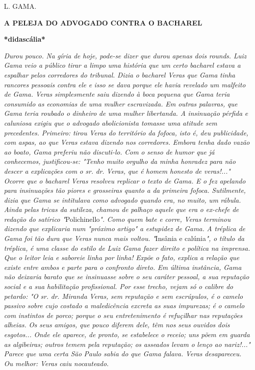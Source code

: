 L. GAMA.

\textbf{A PELEJA DO
ADVOGADO CONTRA O BACHAREL}

\textbf{*didascália*}

\emph{Durou pouco. Na gíria de hoje, pode-se dizer que durou apenas dois
rounds. Luiz Gama veio a público tirar a limpo uma história que um certo
bacharel estava a espalhar pelos corredores do tribunal. Dizia o
bacharel Veras que Gama tinha rancores pessoais contra ele e isso se
dava porque ele havia revelado um malfeito de Gama. Veras simplesmente
saiu dizendo à boca pequena que Gama teria consumido as economias de uma
mulher escravizada. Em outras palavras, que Gama teria roubado o
dinheiro de uma mulher libertanda. A insinuação pérfida e caluniosa
exigiu que o advogado abolicionista tomasse uma atitude sem precedentes.
Primeiro: tirou Veras do território da fofoca, isto é, deu publicidade,
com aspas, ao que Veras estava dizendo nos corredores. Embora tenha dado
vazão ao boato, Gama preferiu não discuti-lo. Com o senso de humor que
já conhecemos, justificou-se: "Tenho muito orgulho da minha honradez
para não descer a explicações com o sr. dr. Veras, que é homem honesto
de veras!..." Ocorre que o bacharel Veras resolveu replicar o texto de
Gama. E o fez apelando para insinuações tão piores e grosseiras quanto a
da primeira fofoca. Sutilmente, dizia que Gama se intitulava como
advogado quando era, no muito, um rábula. Ainda pelas tricas da
sutileza, chamou de palhaço aquele que era o ex-chefe de redação do
satírico "}Polichinello\emph{". Como quem bate e corre, Veras terminou
dizendo que explicaria num "próximo artigo" a estupidez de Gama. A
tréplica de Gama foi tão dura que Veras nunca mais voltou. "}Insânia e
calúnia\emph{", o título da tréplica, é uma classe do estilo de Luiz
Gama fazer direito e política na imprensa. Que o leitor leia e saboreie
linha por linha! Expõe o fato, explica a relação que existe entre ambos
e parte para o confronto direto. Em última instância, Gama não deixaria
barato que se insinuasse sobre o seu caráter pessoal, a sua reputação
social e a sua habilitação profissional. Por esse trecho, vejam só o
calibre do petardo: "O sr. dr. Miranda Veras, sem reputação e sem
escrúpulos, é o camelo passivo sobre cujo costado a maledicência excreta
as suas impurezas; é o camelo com instintos de porco; porque o seu
entretenimento é refuçilhar nas reputações alheias. Os seus amigos, que
pouco diferem dele, têm nos seus ouvidos dois esgotos... Onde ele
aparece, de pronto, se estabelece o receio; uns põem em guarda as
algibeiras; outros temem pela reputação; os asseados levam o lenço ao
nariz!..." Parece que uma certa São Paulo sabia do que Gama falava.
Veras desapareceu. Ou melhor: Veras caiu nocauteado. }

